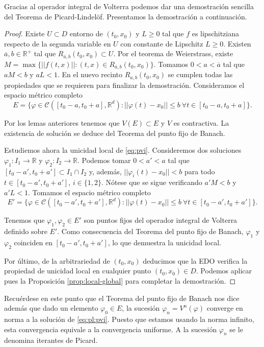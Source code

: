 \documentclass{article}
\begin{document}
Gracias al operador integral de Volterra podemos dar una demostración sencilla del Teorema de
Picard-Lindelöf. Presentamos la demostración a continuación.

\begin{proof}
  Existe $U \subset D$ entorno de $(t_0, x_0)$ y $L \ge 0$ tal que $f$ es lipschitziana respecto de
  la segunda variable en $U$ con constante de Lipschitz $L \ge 0$. Existen
  $\overline{a}, b \in \mathbb{R}^+$ tal que $R_{\overline{a},b}(t_0, x_0) \subset U$. Por el
  teorema de Weierstrass, existe $M = \max \{||f(t,x)|| : (t,x) \in R_{\overline{a},b}(t_0,
  x_0)\}$. Tomamos $0 < a < \overline{a}$ tal que $a M < b$ y $a L < 1$. En el nuevo recinto
  $R_{a,b}(t_0, x_0)$ se cumplen todas las propiedades que se requieren para finalizar la
  demostración. Consideramos el espacio métrico completo
  \[E = \{\varphi \in \mathcal{C}([t_0-a, t_0+a], \mathbb{R}^d): ||\varphi(t)-x_0|| \le b \ \forall
    t \in [t_0-a, t_0+a]\}.\]

  Por los lemas anteriores tenemos que $V(E) \subset E$ y $V$ es contractiva. La existencia de
  solución se deduce del Teorema del punto fijo de Banach.

  Estudiemos ahora la unicidad local de \eqref{eq:pvi}. Consideremos dos soluciones
  $\varphi_1: I_1 \to \mathbb{R}$ y $\varphi_2: I_2 \to \mathbb{R}$. Podemos tomar $0 < a' < a$ tal
  que $[t_0-a', t_0+a'] \subset I_1 \cap I_2$ y, además, $||\varphi_i(t)-x_0|| < b$ para todo
  $t\in [t_0-a', t_0+a']$, $i \in \{1,2\}$. Nótese que se sigue verificando $a'M < b$ y $a'L <
  1$. Tomamos el espacio métrico completo
  \[E' = \{\varphi \in \mathcal{C}([t_0-a', t_0+a'], \mathbb{R}^d): ||\varphi(t)-x_0|| \le b \
    \forall t \in [t_0-a', t_0+a']\}.\]

  Tenemos que $\varphi_1, \varphi_2 \in E'$ son puntos fijos del operador integral de Volterra
  definido sobre $E'$. Como consecuencia del Teorema del punto fijo de Banach, $\varphi_1$ y
  $\varphi_2$ coinciden en $[t_0-a', t_0+a']$, lo que demuestra la unicidad local.

  Por último, de la arbitrariedad de $(t_0, x_0)$ deducimos que la EDO verifica la propiedad de
  unicidad local en cualquier punto $(t_0, x_0) \in D$. Podemos aplicar pues la Proposición
  \ref{prop:local-global} para completar la demostración.
\end{proof}

Recuérdese en este punto que el Teorema del punto fijo de Banach nos dice además que dado un
elemento $\varphi_0 \in E$, la sucesión $\varphi_n = V^n(\varphi)$ converge en norma a la solución
de \ref{eq:pl:pvi}. Puesto que estamos usando la norma infinito, esta convergencia equivale a la
convergencia uniforme. A la sucesión $\varphi_n$ se le denomina iterantes de Picard.
\end{document}
